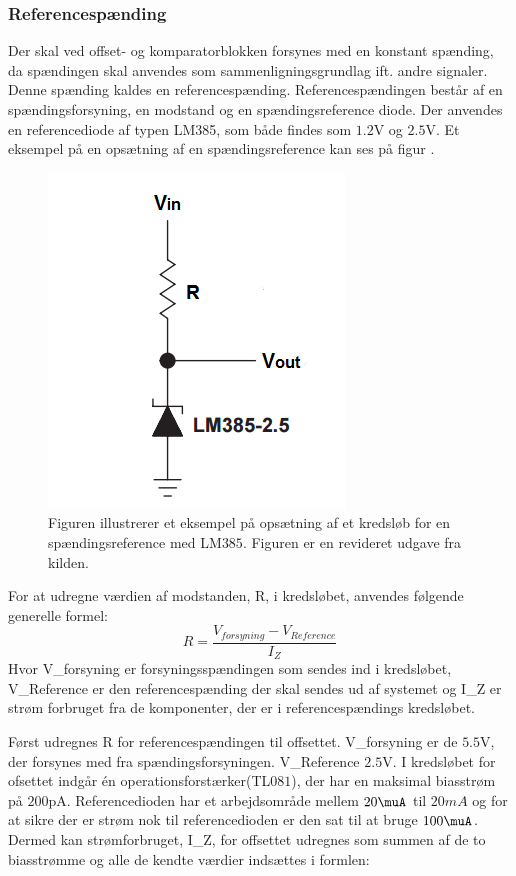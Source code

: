 \subsubsection{Referencespænding}
Der skal ved offset- og komparatorblokken forsynes med en konstant spænding, da spændingen skal anvendes som sammenligningsgrundlag ift. andre signaler. Denne spænding kaldes en referencespænding. Referencespændingen består af en spændingsforsyning, en modstand og en spændingsreference diode. Der anvendes en referencediode af typen LM385, som både findes som $1.2$V og $2.5$V. Et eksempel på en opsætning af en spændingsreference kan ses på figur .

\begin{figure}[H]
	\centering
	\includegraphics[scale=1.0]{figures/cProblemloesning/ReferenceEksempel}
	\caption{Figuren illustrerer et eksempel på opsætning af et kredsløb for en spændingsreference med LM$385$. Figuren er en revideret udgave fra kilden. \cite{Instruments2005}}
	\label{fig:Spaendingsreference}
\end{figure}

For at udregne værdien af modstanden, R, i kredsløbet, anvendes følgende generelle formel:
\begin{equation}
R=\dfrac{V_{forsyning}-V_{Reference}}{I_{Z}}
\end{equation}
Hvor V_{forsyning} er forsyningsspændingen som sendes ind i kredsløbet, V_{Reference} er den referencespænding der skal sendes ud af systemet og I_{Z} er strøm forbruget fra de komponenter, der er i referencespændings kredsløbet. 

Først udregnes R for referencespændingen til offsettet. V_{forsyning} er de $5.5$V, der forsynes med fra spændingsforsyningen. V_{Reference} $2.5$V. I kredsløbet for ofsettet indgår én operationsforstærker(TL$081$), der har en maksimal biasstrøm på $200$pA. Referencedioden har et arbejdsområde mellem $20\muA$ til $20mA$ og for at sikre der er strøm nok til referencedioden er den sat til at bruge $100\muA$. Dermed kan strømforbruget, I_Z, for offsettet udregnes som summen af de to biasstrømme og alle de kendte værdier indsættes i formlen:

